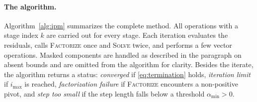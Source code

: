 \paragraph{The algorithm.}
Algorithm~\ref{alg:ipm} summarizes the complete method.
All operations with a stage index $k$ are carried out for every stage.
Each iteration evaluates the residuals, calls \textsc{Factorize} once and \textsc{Solve} twice, and performs a few vector operations.
Masked components are handled as described in the paragraph on absent bounds and are omitted from the algorithm for clarity.
Besides the iterate, the algorithm returns a status: \textit{converged} if \eqref{eq:termination} holds, \textit{iteration limit} if $i_{\max}$ is reached, \textit{factorization failure} if \textsc{Factorize} encounters a non-positive pivot, and \textit{step too small} if the step length falls below a threshold $\alpha_{\min} > 0$.

